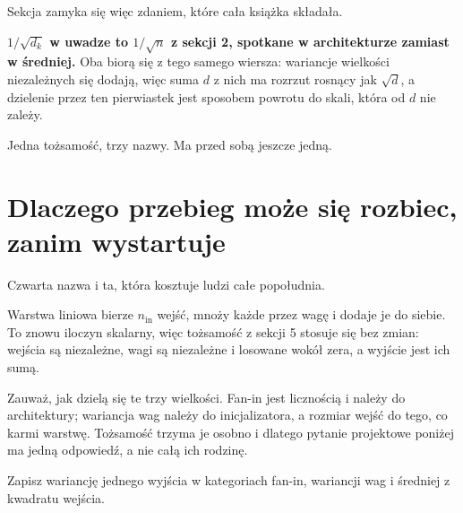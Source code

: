 \begin{fr}
Sekcja zamyka się więc zdaniem, które cała książka składała.

\textbf{$1/\sqrt{d_k}$ w uwadze to $1/\sqrt{n}$ z sekcji 2, spotkane w
architekturze zamiast w średniej.} Oba biorą się z tego samego wiersza:
wariancje wielkości niezależnych się dodają, więc suma $d$ z nich ma rozrzut
rosnący jak $\sqrt{d}$, a dzielenie przez ten pierwiastek jest sposobem powrotu
do skali, która od $d$ nie zależy.

Jedna tożsamość, trzy nazwy. Ma przed sobą jeszcze jedną.
\end{fr}

\section{Dlaczego przebieg może się rozbiec, zanim wystartuje}
\label{sec:P25-initialisation}

\begin{fr}
Czwarta nazwa i ta, która kosztuje ludzi całe popołudnia.

Warstwa liniowa bierze $n_{\text{in}}$ wejść, mnoży każde przez wagę i dodaje
je do siebie. To znowu iloczyn skalarny, więc tożsamość z sekcji 5 stosuje się
bez zmian: wejścia są niezależne, wagi są niezależne i losowane wokół zera, a
wyjście jest ich sumą.

Zauważ, jak dzielą się te trzy wielkości. Fan-in jest licznością i należy do
architektury; wariancja wag należy do inicjalizatora, a rozmiar wejść do tego,
co karmi warstwę. Tożsamość trzyma je osobno i dlatego pytanie projektowe
poniżej ma jedną odpowiedź, a nie całą ich rodzinę.

Zapisz wariancję jednego wyjścia w kategoriach fan-in, wariancji wag i
średniej z kwadratu wejścia.
\dotline
\nextframe
\end{fr}

